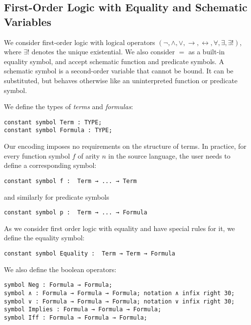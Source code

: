 \documentclass{article}
\begin{document}
\newpage	
	
	\subsection{First-Order Logic with Equality and Schematic Variables}
	We consider first-order logic with logical operators $(\neg, \land, \lor, \rightarrow, \leftrightarrow, \forall, \exists, \exists !)$, where $\exists !$ denotes the unique existential. We also consider $=$ as a built-in equality symbol, and accept schematic function and predicate symbols. A schematic symbol is a second-order variable that cannot be bound. It can be substituted, but behaves otherwise like an uninterpreted function or predicate symbol.
	
	We define the types of \textit{terms} and \textit{formulas}:

	\begin{lstlisting}[language=Dialekto]
constant symbol Term : TYPE;
constant symbol Formula : TYPE;
	\end{lstlisting}
	Our encoding imposes no requirements on the structure of terms. In practice,  for every function symbol $f$ of arity $n$ in the source language, the user needs to define a corresponding symbol:
	\begin{lstlisting}[language=Dialekto]
constant symbol f :  Term → ... → Term
	\end{lstlisting}
	and similarly for predicate symbols
	\begin{lstlisting}[language=Dialekto]
constant symbol p :  Term → ... → Formula
	\end{lstlisting}
	As we consider first order logic with equality and have special rules for it, we define the equality symbol:
	\begin{lstlisting}[language=Dialekto]
constant symbol Equality :  Term → Term → Formula
	\end{lstlisting}
	We also define the boolean operators:
	\begin{lstlisting}[language=Dialekto]
symbol Neg : Formula → Formula;
symbol ∧ : Formula → Formula → Formula; notation ∧ infix right 30;
symbol ∨ : Formula → Formula → Formula; notation ∨ infix right 30;
symbol Implies : Formula → Formula → Formula;
symbol Iff : Formula → Formula → Formula;
\end{lstlisting}
\end{document}
